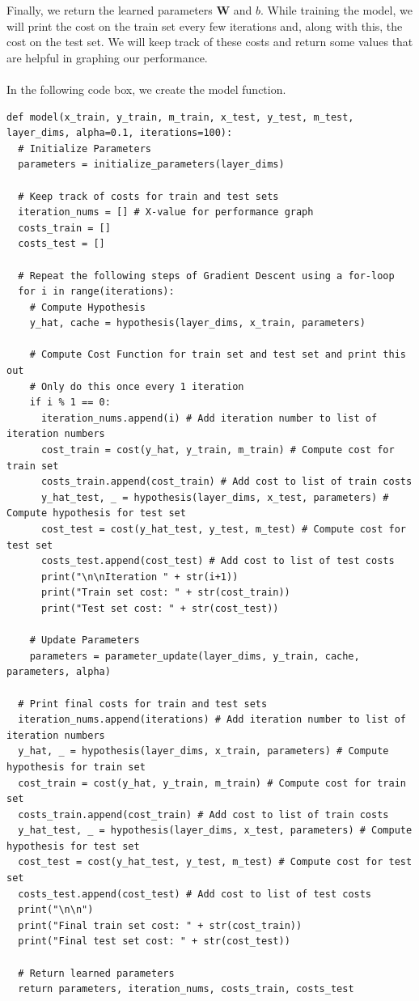 \documentclass{article}
\begin{document}
Finally, we return the learned parameters $\textbf{W}$ and $b$. While training the model, we will print the cost on the train set every few iterations and, along with this, the cost on the test set. We will keep track of these costs and return some values that are helpful in graphing our performance.
\\
\\
In the following code box, we create the model function.
\begin{lstlisting}
def model(x_train, y_train, m_train, x_test, y_test, m_test, layer_dims, alpha=0.1, iterations=100):
  # Initialize Parameters
  parameters = initialize_parameters(layer_dims)

  # Keep track of costs for train and test sets
  iteration_nums = [] # X-value for performance graph
  costs_train = []
  costs_test = []

  # Repeat the following steps of Gradient Descent using a for-loop
  for i in range(iterations):
    # Compute Hypothesis
    y_hat, cache = hypothesis(layer_dims, x_train, parameters)

    # Compute Cost Function for train set and test set and print this out
    # Only do this once every 1 iteration
    if i % 1 == 0:
      iteration_nums.append(i) # Add iteration number to list of iteration numbers
      cost_train = cost(y_hat, y_train, m_train) # Compute cost for train set
      costs_train.append(cost_train) # Add cost to list of train costs
      y_hat_test, _ = hypothesis(layer_dims, x_test, parameters) # Compute hypothesis for test set
      cost_test = cost(y_hat_test, y_test, m_test) # Compute cost for test set
      costs_test.append(cost_test) # Add cost to list of test costs
      print("\n\nIteration " + str(i+1))
      print("Train set cost: " + str(cost_train))
      print("Test set cost: " + str(cost_test))
    
    # Update Parameters
    parameters = parameter_update(layer_dims, y_train, cache, parameters, alpha)
  
  # Print final costs for train and test sets
  iteration_nums.append(iterations) # Add iteration number to list of iteration numbers
  y_hat, _ = hypothesis(layer_dims, x_train, parameters) # Compute hypothesis for train set
  cost_train = cost(y_hat, y_train, m_train) # Compute cost for train set
  costs_train.append(cost_train) # Add cost to list of train costs
  y_hat_test, _ = hypothesis(layer_dims, x_test, parameters) # Compute hypothesis for test set
  cost_test = cost(y_hat_test, y_test, m_test) # Compute cost for test set
  costs_test.append(cost_test) # Add cost to list of test costs
  print("\n\n")
  print("Final train set cost: " + str(cost_train))
  print("Final test set cost: " + str(cost_test))

  # Return learned parameters
  return parameters, iteration_nums, costs_train, costs_test
\end{lstlisting}
\end{document}
